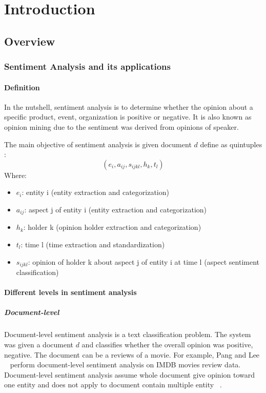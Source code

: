 \hypertarget{chap:intro}{\chapter{Introduction}}
\section{Overview}
\subsection{Sentiment Analysis and its applications}
\subsubsection{Definition}
In the nutshell, sentiment analysis is to determine whether the opinion about a specific product, event, organization is positive or negative. It is also known as opinion mining due to the sentiment was derived from opinions of speaker.

The main objective of sentiment analysis is given document $d$ define as quintuples \cite{liu2012sentiment}:  
\[ ( e_{i}, a_{ij}, s_{ijkl}, h_{k}, t_{l} ) \]
 Where:
\begin{itemize}
	\item $e_{i}$: entity i (entity extraction and categorization)
	\item $a_{ij}$: aspect j of entity i (entity extraction and categorization)
	\item $h_{k}$: holder k (opinion holder extraction and categorization)
	\item $t_{l}$: time l (time extraction and standardization)
	\item $s_{ijkl}$: opinion of holder k about aspect j of entity i at time l (aspect sentiment classification)
\end{itemize}


\subsubsection{Different levels in sentiment analysis}
\paragraph{Document-level}
Document-level sentiment analysis is a text classification problem. The system was given a document $d$ and classifies whether the overall opinion was positive, negative. The document can be a reviews of a movie. For example, Pang and Lee ~\cite{pang2002thumbs} perform document-level sentiment analysis on IMDB movies review data. Document-level sentiment analysis assume whole document give opinion toward one entity and does not apply to document contain multiple entity ~\cite{liu2012sentiment}.
 

